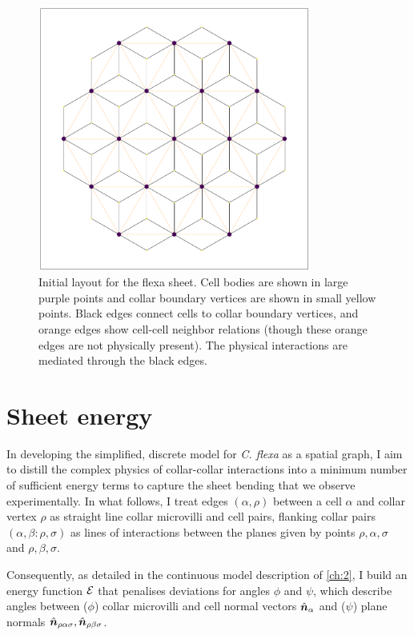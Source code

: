 \begin{figure}[hbtp]
    \centering
    \includegraphics[width=0.8\textwidth]{layout_init.png}
    \caption[Initial layout of the hexagonal lattice flexa sheet]{Initial layout for the flexa sheet. Cell bodies are shown in large purple points and collar boundary vertices are shown in small yellow points. Black edges connect cells to collar boundary vertices, and orange edges show cell-cell neighbor relations (though these orange edges are not physically present). The physical interactions are mediated through the black edges.}
    \label{fig:layout_init}
\end{figure}

\section{Sheet energy}

In developing the simplified, discrete model for \textit{C. flexa} as a spatial graph, I aim to distill the complex physics of collar-collar interactions into a minimum number of sufficient energy terms to capture the sheet bending that we observe experimentally. In what follows, I treat edges $(\alpha, \rho)$ between a cell $\alpha$ and collar vertex $\rho$ as straight line collar microvilli and cell pairs, flanking collar pairs $(\alpha, \beta: \rho, \sigma)$ as lines of interactions between the planes given by points $\rho, \alpha, \sigma$ and $\rho, \beta, \sigma$. 

Consequently, as detailed in the continuous model description of \cref{ch:2}, I build an energy function $\mathcal{E}$ that penalises deviations for angles $\phi$ and $\psi$, which describe angles between ($\phi$) collar microvilli and cell normal vectors $\hat{\bm{n}}_\alpha$ and ($\psi$) plane normals $\hat{\bm{n}}_{\rho\alpha\sigma}, \hat{\bm{n}}_{\rho\beta\sigma}$.

